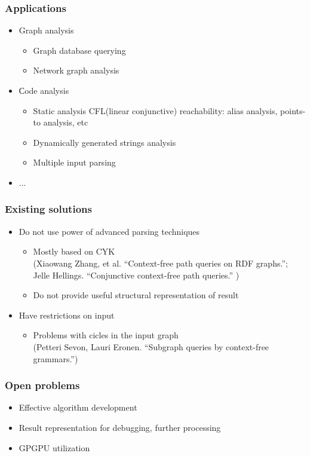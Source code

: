 \documentclass{beamer}
\begin{document}
\begin{frame}[fragile]
  \transwipe[direction=90]
  \frametitle{Applications}
  \begin{itemize}
    \item Graph analysis
    \begin{itemize}
      \item Graph database querying
      \item Network graph analysis    
    \end{itemize}
    \item Сode analysis
    \begin{itemize}
      \item Static analysis CFL(linear conjunctive) reachability: alias analysis, points-to analysis, etc
      \item Dynamically generated strings analysis
      \item Multiple input parsing 
    \end{itemize}
    \item ...
  \end{itemize}
\end{frame}

\begin{frame}
  \transwipe[direction=90]
  \frametitle{Existing solutions}
  \begin{itemize}
    \item Do not use power of advanced parsing techniques
    \begin{itemize}
       \item Mostly based on CYK \\ (Xiaowang Zhang, et al. ``Context-free path queries on RDF graphs.''; \\ Jelle Hellings. ``Conjunctive context-free path queries.'' )
       \item Do not provide useful structural representation of result
     \end{itemize}
    \item Have restrictions on input
    \begin{itemize}
       \item Problems with cicles in the input graph \\ (Petteri Sevon, Lauri Eronen. ``Subgraph queries by context-free grammars.'')
     \end{itemize}
  \end{itemize}
\end{frame}

\begin{frame}
  \transwipe[direction=90]
  \frametitle{Open problems}
  \begin{itemize}
    \item Effective algorithm development
    \item Result representation for debugging, further processing 
    \item GPGPU utilization
  \end{itemize}
\end{frame}
\end{document}
